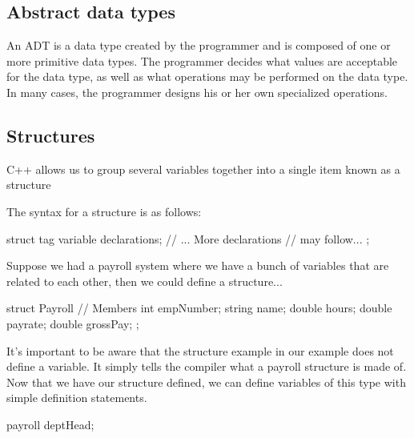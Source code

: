 \documentclass{report}
\begin{document}
	\bigbreak \noindent 
	\subsection{Abstract data types}
	\bigbreak \noindent 
	An ADT is a data type created by the programmer and is composed of one or more primitive data types. The programmer decides what values are acceptable for the data type, as well as what operations may be performed on the data type. In many cases, the programmer designs his or her own specialized operations.

	\bigbreak \noindent 
	\subsection{Structures}
	\bigbreak \noindent 
	\begin{concept}
	    C++ allows us to group several variables together into a single item known as a structure
	\end{concept}
	\bigbreak \noindent 
	The syntax for a structure is as follows:
	\bigbreak \noindent 
	
	\begin{cppcode}
struct tag {
    variable declarations;
    // ... More declarations 
    //     may follow...
};
	\end{cppcode}
	
	\bigbreak \noindent 
	Suppose we had a payroll system where we have a bunch of variables that are related to each other, then we could define a structure...
	\bigbreak \noindent 
	
	\begin{cppcode}
struct Payroll {
    // Members
    int empNumber;
    string name;
    double hours;
    double payrate;
    double grossPay;
};
	\end{cppcode}
	
	\bigbreak \noindent 

    \bigbreak \noindent 
	It's important to be aware that the structure example in our example does not define a variable. It simply tells the compiler what a payroll structure is made of.
	\bigbreak \noindent 
	Now that we have our structure defined, we can define variables of this type with simple definition statements.
	\bigbreak \noindent 
	
	\begin{cppcode}
payroll deptHead;
	\end{cppcode}
	
\end{document}
